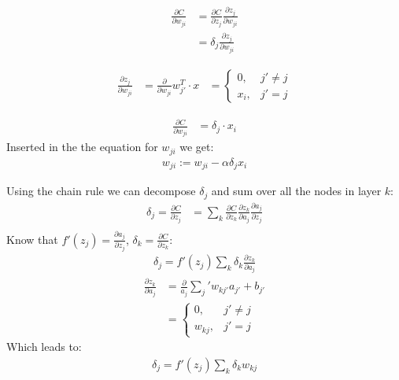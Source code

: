 

\begin{align*}
    \frac{\partial C}{\partial w_{ji}} &= \frac{\partial C}{\partial z_j} \frac{\partial z_j}{\partial w_{ji}} \\
    &= \delta_j \frac{\partial z_j}{\partial w_{ji}}
\end{align*}


\begin{align*}
    \frac{\partial z_j}{\partial w_{ji}} &= \frac{\partial}{\partial w_{ji}} w_{j'}^T \cdot x
    &= \begin{cases}
        0, & j' \neq j \\
        x_i, & j' = j
    \end{cases}
\end{align*}


\begin{align*}
    \frac{\partial C}{\partial w_{ji}} &= \delta_j \cdot x_i
\end{align*}
Inserted in the the equation for $w_{ji}$ we get:
\begin{align*}
    w_{ji} := w_{ji} - \alpha \delta_j x_i
\end{align*}


Using the chain rule we can decompose $\delta_j$ and sum over all the nodes in layer $k$:
\begin{align*}
    \delta_j = \frac{\partial C}{\partial z_j} &= \sum_k \frac{\partial C}{\partial z_k} \frac{\partial z_k}{\partial a_j} \frac{\partial a_j}{\partial z_j} \\
\end{align*}
Know that $f'(z_j) = \frac{\partial a_j}{\partial z_j}$, $\delta_k = \frac{\partial C}{\partial z_k}$:
\begin{align*}
    \delta_j = f'(z_j) \sum_k \delta_k \frac{\partial z_k}{\partial a_j}
\end{align*}
\begin{align*}
    \frac{\partial z_k}{\partial a_j} &= \frac{\partial}{a_j} \sum_j' w_{kj'}a_{j'} + b_{j'} \\
    &= \begin{cases}
        0, & j' \neq j \\
        w_{kj}, & j' = j
    \end{cases}
\end{align*}
Which leads to:
\begin{align*}
    \delta_j = f'(z_j) \sum_k \delta_k w_{kj}
\end{align*}